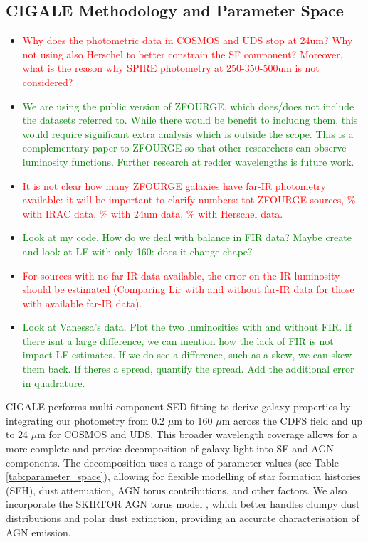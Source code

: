 \subsection{CIGALE Methodology and Parameter Space} \label{Sec: CIGALE_Parameters}
\begin{itemize}
    \item \textcolor{red}{Why does the photometric data in COSMOS and UDS stop at 24um? Why not using also Herschel to better constrain the SF component? Moreover, what is the reason why SPIRE photometry at 250-350-500um is not considered?}
    \item \textcolor{Green}{We are using the public version of ZFOURGE, which does/does not include the datasets referred to. While there would be benefit to includng them, this would require significant extra analysis which is outside the scope. This is a complementary paper to ZFOURGE so that other researchers can observe luminosity functions. Further research at redder wavelengths is future work.}
    \vspace{0.25cm}
    
    \item \textcolor{red}{It is not clear how many ZFOURGE galaxies have far-IR photometry available: it will be important to clarify numbers: tot ZFOURGE sources, \% with IRAC data, \% with 24um data, \% with Herschel data.}
    \item \textcolor{Green}{Look at my code. How do we deal with balance in FIR data? Maybe create and look at LF with only 160: does it change chape?}
    \vspace{0.25cm}
    
    \item \textcolor{red}{For sources with no far-IR data available, the error on the IR luminosity should be estimated (Comparing Lir with and without far-IR data for those with available far-IR data).}
    \item \textcolor{Green}{Look at Vanessa's data. Plot the two luminosities with and without FIR. If there isnt a large difference, we can mention how the lack of FIR is not impact LF estimates. If we do see a difference, such as a skew, we can skew them back. If theres a spread, quantify the spread. Add the additional error in quadrature.}
    
\end{itemize}

CIGALE performs multi-component SED fitting to derive galaxy properties by integrating our photometry from 0.2 $\mu$m to 160 $\mu$m across the CDFS field and up to 24 $\mu$m for COSMOS and UDS. This broader wavelength coverage allows for a more complete and precise decomposition of galaxy light into SF and AGN components. The decomposition uses a range of parameter values (see Table \ref{tab:parameter_space}), allowing for flexible modelling of star formation histories (SFH), dust attenuation, AGN torus contributions, and other factors. We also incorporate the SKIRTOR AGN torus model \citep{stalevski_dust_2016}, which better handles clumpy dust distributions and polar dust extinction, providing an accurate characterisation of AGN emission.

